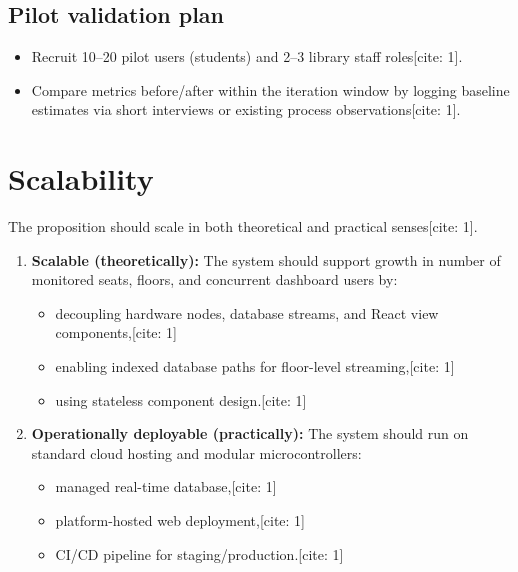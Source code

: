 \documentclass[11pt,a4paper]{article}
\begin{document}
\subsection{Pilot validation plan}
\begin{itemize}[leftmargin=0.7cm]
    \item Recruit 10--20 pilot users (students) and 2--3 library staff roles[cite: 1].
    \item Compare metrics before/after within the iteration window by logging baseline estimates via short interviews or existing process observations[cite: 1].
\end{itemize}

\section{Scalability}
The proposition should scale in both theoretical and practical senses[cite: 1].

\begin{enumerate}[leftmargin=0.7cm]
    \item \textbf{Scalable (theoretically):} The system should support growth in number of monitored seats, floors, and concurrent dashboard users by:
    \begin{itemize}[leftmargin=0.7cm]
        \item decoupling hardware nodes, database streams, and React view components,[cite: 1]
        \item enabling indexed database paths for floor-level streaming,[cite: 1]
        \item using stateless component design.[cite: 1]
    \end{itemize}
    
    \item \textbf{Operationally deployable (practically):} The system should run on standard cloud hosting and modular microcontrollers:
    \begin{itemize}[leftmargin=0.7cm]
        \item managed real-time database,[cite: 1]
        \item platform-hosted web deployment,[cite: 1]
        \item CI/CD pipeline for staging/production.[cite: 1]
    \end{itemize}
\end{enumerate}
\end{document}
